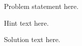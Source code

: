 
Problem statement here.

\begin{hint}
Hint text here.
\end{hint}

\begin{solution}
Solution text here.
\end{solution}
